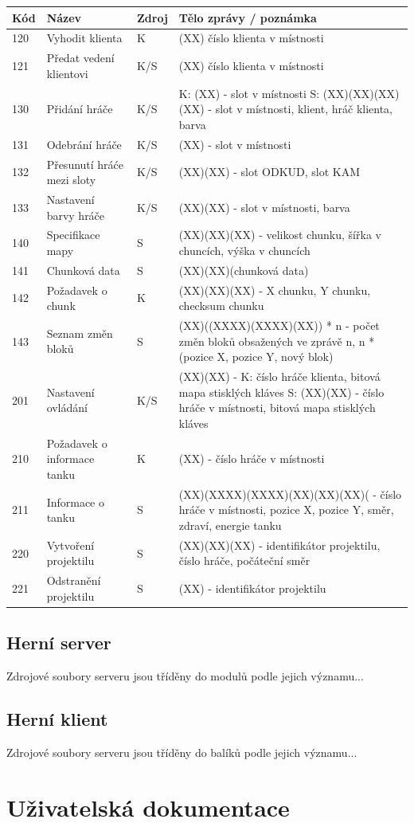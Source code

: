 \documentclass[12pt,a4paper]{article}
\let\oldsection\section
\renewcommand\section{\clearpage\oldsection}
\begin{document}
\begin{table}[h]
\center
\begin{tabular}{|l|p{3cm}|l|p{10cm}|}
\hline
\textbf{Kód} & \textbf{Název} & \textbf{Zdroj} & \textbf{Tělo zprávy / poznámka}\\ \hline
120 & Vyhodit klienta & K & (XX) číslo klienta v místnosti \\ \hline
121 & Předat vedení klientovi & K/S & (XX) číslo klienta v místnosti \\ \hline
130 & Přidání hráče & K/S & K: (XX) - slot v místnosti \newline S: (XX)(XX)(XX)(XX) - slot v místnosti, klient, hráč klienta, barva \\ \hline
131 & Odebrání hráče & K/S & (XX) - slot v místnosti \\ \hline
132 & Přesunutí hráće mezi sloty & K/S& (XX)(XX) - slot ODKUD, slot KAM \\ \hline
133 & Nastavení barvy hráče & K/S & (XX)(XX) - slot v místnosti, barva \\ \hline
140 & Specifikace mapy & S & (XX)(XX)(XX) - velikost chunku, šířka v chuncích, výška v chuncích \\ \hline
141 & Chunková data & S & (XX)(XX)(chunková data)\\ \hline
142 & Požadavek o chunk & K & (XX)(XX)(XX) - X chunku, Y chunku, checksum chunku \\ \hline
143 & Seznam změn bloků & S & (XX)((XXXX)(XXXX)(XX)) * n - počet změn bloků obsažených ve zprávě n, n * (pozice X, pozice Y, nový blok) \\ \hline
201 & Nastavení ovládání & K/S & (XX)(XX) - K: číslo hráče klienta, bitová mapa stisklých kláves \newline S: (XX)(XX) - číslo hráče v místnosti, bitová mapa stisklých kláves \\ \hline
210 & Požadavek o informace tanku & K & (XX) - číslo hráče v místnosti \\ \hline
211 & Informace o tanku & S & (XX)(XXXX)(XXXX)(XX)(XX)(XX)( - číslo hráče v místnosti, pozice X, pozice Y, směr, zdraví, energie tanku \\ \hline
220 & Vytvoření projektilu & S & (XX)(XX)(XX) - identifikátor projektilu, číslo hráče, počáteční směr \\ \hline
221 & Odstranění projektilu & S & (XX) - identifikátor projektilu \\ \hline


\end{tabular}
\end{table}


\subsection{Herní server}
Zdrojové soubory serveru jsou tříděny do modulů podle jejich významu...
\subsection{Herní klient}
Zdrojové soubory serveru jsou tříděny do balíků podle jejich významu...
\section{Uživatelská dokumentace}




\end{document}
